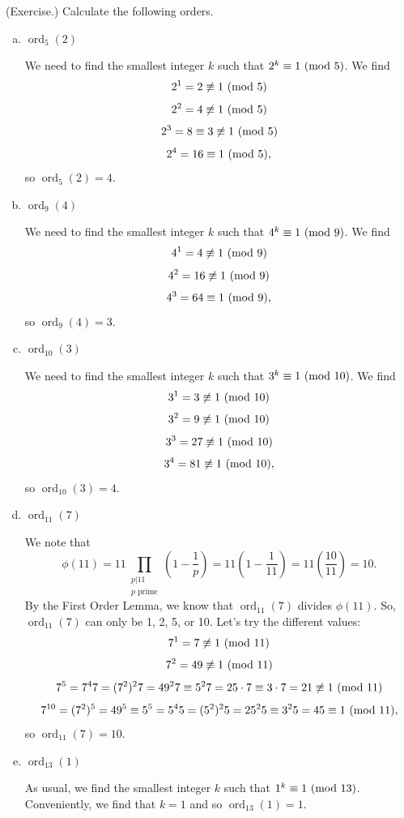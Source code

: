 \documentclass[letterpaper]{article}
\DeclareMathOperator{\ord}{ord}
\begin{document}
\begin{mdframed}
    (Exercise.) Calculate the following orders. 
    \begin{enumerate}[(a)]
        \item $\ord_{5}(2)$
        \begin{mdframed}
            We need to find the smallest integer $k$ such that $2^k \equiv 1 \ (\mathrm{mod}\ 5)$. We find 
            \[2^1 = 2 \not\equiv 1 \ (\mathrm{mod}\ 5)\]
            \[2^2 = 4 \not\equiv 1 \ (\mathrm{mod}\ 5)\]
            \[2^3 = 8 \equiv 3 \not\equiv 1 \ (\mathrm{mod}\ 5)\]
            \[2^4 = 16 \equiv 1 \ (\mathrm{mod}\ 5),\]
            so $\ord_{5}(2) = 4$. 
        \end{mdframed}
        \item $\ord_{9}(4)$
        \begin{mdframed}
            We need to find the smallest integer $k$ such that $4^k \equiv 1 \ (\mathrm{mod}\ 9)$. We find 
            \[4^1 = 4 \not\equiv 1 \ (\mathrm{mod}\ 9)\]
            \[4^2 = 16 \not\equiv 1 \ (\mathrm{mod}\ 9)\]
            \[4^3 = 64 \equiv 1 \ (\mathrm{mod}\ 9),\]
            so $\ord_{9}(4) = 3$.
        \end{mdframed}
        \item $\ord_{10}(3)$
        \begin{mdframed}
            We need to find the smallest integer $k$ such that $3^k \equiv 1 \ (\mathrm{mod}\ 10)$. We find 
            \[3^1 = 3 \not\equiv 1 \ (\mathrm{mod}\ 10)\]
            \[3^2 = 9 \not\equiv 1 \ (\mathrm{mod}\ 10)\]
            \[3^3 = 27 \not\equiv 1 \ (\mathrm{mod}\ 10)\]
            \[3^4 = 81 \not\equiv 1 \ (\mathrm{mod}\ 10),\]
            so $\ord_{10}(3) = 4$.     
        \end{mdframed}

        \item $\ord_{11}(7)$
        \begin{mdframed}
            We note that \[\phi(11) = 11\prod_{\substack{p | 11 \\ p \text{ prime}}}\left(1 - \frac{1}{p}\right) = 11\left(1 - \frac{1}{11}\right) = 11\left(\frac{10}{11}\right) = 10.\] By the First Order Lemma, we know that $\ord_{11}(7)$ divides $\phi(11)$. So, $\ord_{11}(7)$ can only be 1, 2, 5, or 10. Let's try the different values:
            \[7^1 = 7 \not\equiv 1 \ (\mathrm{mod}\ 11)\]
            \[7^2 = 49 \not\equiv 1 \ (\mathrm{mod}\ 11)\]
            \[7^5 = 7^4 7 = (7^2)^2 7 = 49^2 7 \equiv 5^2 7 = 25 \cdot 7 \equiv 3 \cdot 7 = 21 \not\equiv 1 \ (\mathrm{mod}\ 11)\]
            \[7^{10} = (7^2)^5 = 49^5 \equiv 5^5 = 5^4 5 = (5^2)^2 5 = 25^2 5 \equiv 3^2 5 = 45 \equiv 1 \ (\mathrm{mod}\ 11),\]
            so $\ord_{11}(7) = 10$. 
        \end{mdframed}
        \item $\ord_{13}(1)$
        \begin{mdframed}
            As usual, we find the smallest integer $k$ such that $1^k \equiv 1 \ (\mathrm{mod}\ 13)$. Conveniently, we find that $k = 1$ and so $\ord_{13}(1) = 1$. 
        \end{mdframed}
    \end{enumerate}
\end{mdframed}
\end{document}
